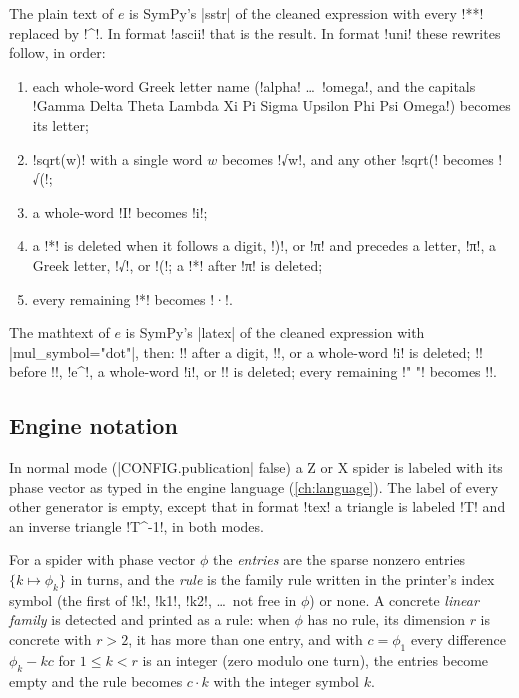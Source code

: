 {\begin{algorithm}\label{alg:pictorial-text}
The plain text of $e$ is SymPy's \py|sstr| of the cleaned expression with every \code!**!
replaced by \code!^!. In format \code!ascii! that is the result. In format \code!uni! these
rewrites follow, in order:
\begin{enumerate}
  \item each whole-word Greek letter name (\code!alpha! \ldots\ \code!omega!, and the capitals
    \code!Gamma Delta Theta Lambda Xi Pi Sigma Upsilon Phi Psi Omega!) becomes its letter;
  \item \code!sqrt(w)! with a single word $w$ becomes \pgi!√w!, and any other \code!sqrt(!
    becomes \pgi!√(!;
  \item a whole-word \code!I! becomes \code!i!;
  \item a \code!*! is deleted when it follows a digit, \code!)!, or \pgi!π! and precedes a
    letter, \pgi!π!, a Greek letter, \pgi!√!, or \code!(!; a \code!*! after \pgi!π! is
    deleted;
  \item every remaining \code!*! becomes \pgi!·!.
\end{enumerate}
\end{algorithm}

\begin{algorithm}[Mathtext]\label{alg:pictorial-tex}
The mathtext of $e$ is SymPy's \py|latex| of the cleaned expression with
\py|mul_symbol="dot"|, then: \code!\cdot! after a digit, \code!\pi!, or a whole-word \code!i! is
deleted; \code!\cdot! before \code!\pi!, \code!e^!, a whole-word \code!i!, or \code!\sqrt! is
deleted; every remaining \code!" \cdot "! becomes \code!{\cdot}!.
\end{algorithm}

\subsection{Engine notation}\label{sec:pictorial-engine-labels}

In normal mode (\py|CONFIG.publication| false) a Z or X spider is labeled with its phase vector
as typed in the engine language (\cref{ch:language}). The label of every other generator is
empty, except that in format \code!tex! a triangle is labeled \code!T! and an inverse triangle
\code!T^{-1}!, in both modes.

\begin{definition}\label{def:pictorial-entries}
For a spider with phase vector $\phi$ the \emph{entries} are the sparse nonzero entries
$\{k\mapsto\phi_k\}$ in turns, and the \emph{rule} is the family rule written in the printer's
index symbol (the first of \code!k!, \code!k1!, \code!k2!, \ldots\ not free in $\phi$) or none.
A concrete \emph{linear family} is detected and printed as a rule: when $\phi$ has no rule, its
dimension $r$ is concrete with $r>2$, it has more than one entry, and with $c = \phi_1$ every
difference $\phi_k - k c$ for $1\le k<r$ is an integer (zero modulo one turn), the entries become
empty and the rule becomes $c\cdot k$ with the integer symbol $k$.
\end{definition}

}
